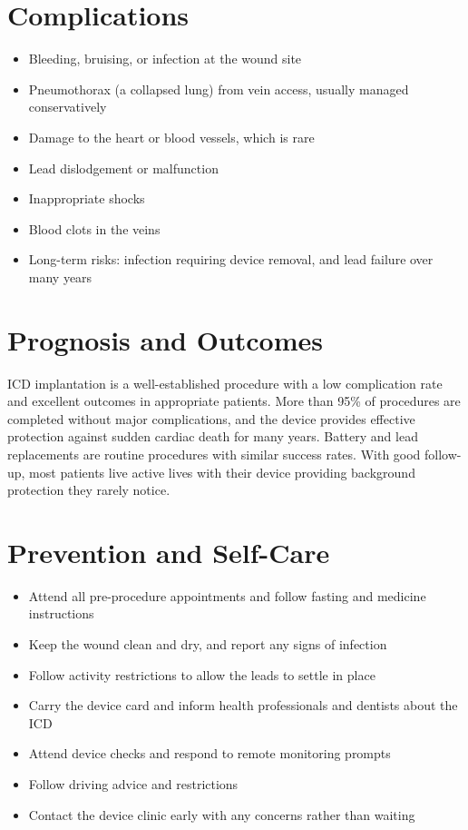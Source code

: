 \section*{Complications}
\begin{itemize}
    \item Bleeding, bruising, or infection at the wound site
    \item Pneumothorax (a collapsed lung) from vein access, usually managed conservatively
    \item Damage to the heart or blood vessels, which is rare
    \item Lead dislodgement or malfunction
    \item Inappropriate shocks
    \item Blood clots in the veins
    \item Long-term risks: infection requiring device removal, and lead failure over many years
\end{itemize}

\section*{Prognosis and Outcomes}
ICD implantation is a well-established procedure with a low complication rate and excellent outcomes in appropriate patients. More than 95\% of procedures are completed without major complications, and the device provides effective protection against sudden cardiac death for many years. Battery and lead replacements are routine procedures with similar success rates. With good follow-up, most patients live active lives with their device providing background protection they rarely notice.

\section*{Prevention and Self-Care}
\begin{itemize}
    \item Attend all pre-procedure appointments and follow fasting and medicine instructions
    \item Keep the wound clean and dry, and report any signs of infection
    \item Follow activity restrictions to allow the leads to settle in place
    \item Carry the device card and inform health professionals and dentists about the ICD
    \item Attend device checks and respond to remote monitoring prompts
    \item Follow driving advice and restrictions
    \item Contact the device clinic early with any concerns rather than waiting
\end{itemize}

